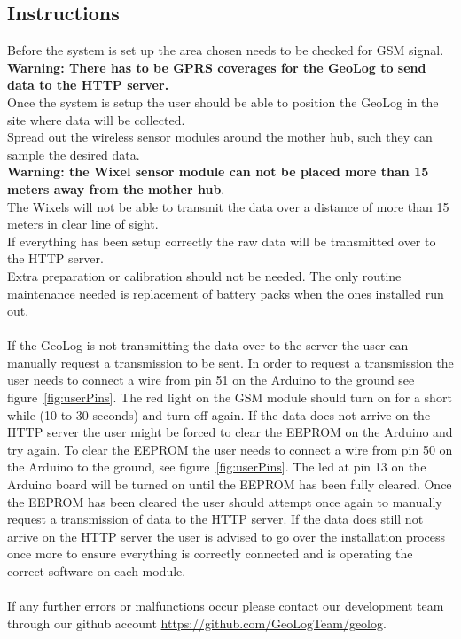 \subsection{Instructions}
Before the system is set up the area chosen needs to be checked for GSM signal.\\
\textbf{Warning: There has to be GPRS coverages for the GeoLog to send data to the HTTP server.}\\
Once the system is setup the user should be able to position the GeoLog in the site where data will be collected.\\
 Spread out the wireless sensor modules around the mother hub, such they can sample the desired data.\\
\textbf{Warning: the Wixel sensor module can not be placed more than 15 meters away from the mother hub}.\\ 
The Wixels will not be able to transmit the data over a distance of more than 15 meters in clear line of sight.\\
If everything has been setup correctly the raw data will be transmitted over to the HTTP server.\\
Extra preparation or calibration should not be needed. The only routine maintenance needed is replacement of battery packs when the ones installed run out.\\\\ %
If the GeoLog is not transmitting the data over to the server the user can manually request a transmission to be sent. In order to request a transmission the user needs to connect a wire from pin 51 on the Arduino to the ground see figure~\ref{fig:userPins}. The red light on the GSM module should turn on for a short while (10 to 30 seconds) and turn off again. If the data does not arrive on the HTTP server the user might be forced to clear the EEPROM on the Arduino and try again. To clear the EEPROM the user needs to connect a wire from pin 50 on the Arduino to the ground, see figure~\ref{fig:userPins}. The led at pin 13 on the Arduino board will be turned on until the EEPROM has been fully cleared. Once the EEPROM has been cleared the user should attempt once again to manually request a transmission of data to the HTTP server. If the data does still not arrive on the HTTP server the user is advised to go over the installation process once more to ensure everything is correctly connected and is operating the correct software on each module. 
\\
\\
If any further errors or malfunctions occur please contact our development team through our github account \url{https://github.com/GeoLogTeam/geolog}.  

